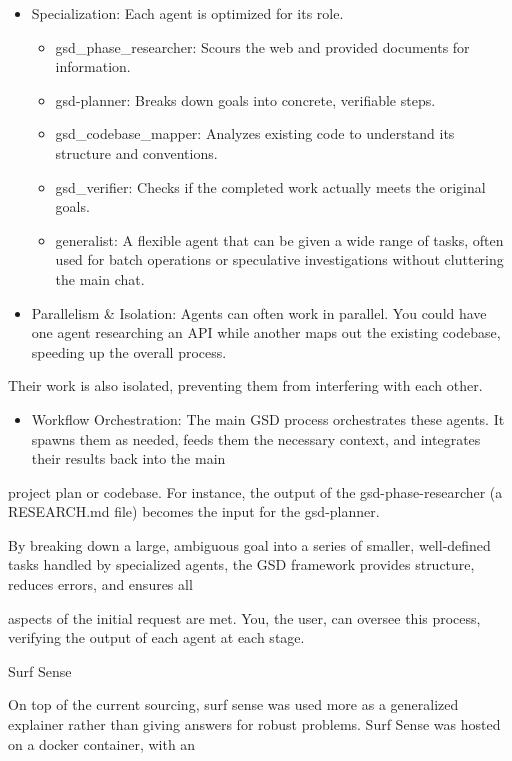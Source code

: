 \begin{itemize}
\item
  Specialization: Each agent is optimized for its role.

  \begin{itemize}
  \item
    gsd\_phase\_researcher: Scours the web and provided documents for
    information.
  \item
    gsd-planner: Breaks down goals into concrete, verifiable steps.
  \item
    gsd\_codebase\_mapper: Analyzes existing code to understand its
    structure and conventions.
  \item
    gsd\_verifier: Checks if the completed work actually meets the
    original goals.
  \item
    generalist: A flexible agent that can be given a wide range of
    tasks, often used for batch operations or speculative investigations
    without cluttering the main chat.
  \end{itemize}
\item
  Parallelism \& Isolation: Agents can often work in parallel. You could
  have one agent researching an API while another maps out the existing
  codebase, speeding up the overall process.
\end{itemize}

Their work is also isolated, preventing them from interfering with each
other.

\begin{itemize}
\item
  Workflow Orchestration: The main GSD process orchestrates these
  agents. It spawns them as needed, feeds them the necessary context,
  and integrates their results back into the main
\end{itemize}

project plan or codebase. For instance, the output of the
gsd-phase-researcher (a RESEARCH.md file) becomes the input for the
gsd-planner.

By breaking down a large, ambiguous goal into a series of smaller,
well-defined tasks handled by specialized agents, the GSD framework
provides structure, reduces errors, and ensures all

aspects of the initial request are met. You, the user, can oversee this
process, verifying the output of each agent at each stage.

Surf Sense

On top of the current sourcing, surf sense was used more as a
generalized explainer rather than giving answers for robust problems.
Surf Sense was hosted on a docker container, with an

